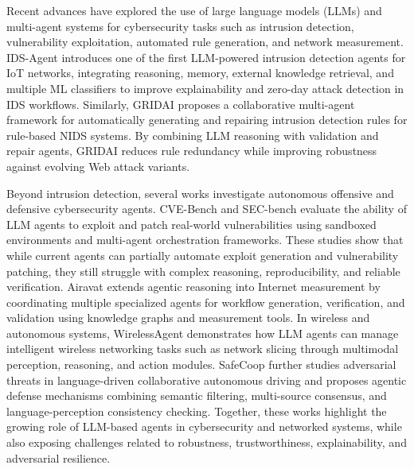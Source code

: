 \documentclass[10pt, twocolumn, letterpaper]{article}
\begin{document}
Recent advances have explored the use of large language models (LLMs) and multi-agent systems for cybersecurity tasks such as intrusion detection, vulnerability exploitation, automated rule generation, and network measurement. IDS-Agent \cite{idsagent}introduces one of the first LLM-powered intrusion detection agents for IoT networks, integrating reasoning, memory, external knowledge retrieval, and multiple ML classifiers to improve explainability and zero-day attack detection in IDS workflows. Similarly, GRIDAI \cite{gridAI} proposes a collaborative multi-agent framework for automatically generating and repairing intrusion detection rules for rule-based NIDS systems. By combining LLM reasoning with validation and repair agents, GRIDAI reduces rule redundancy while improving robustness against evolving Web attack variants.

Beyond intrusion detection, several works investigate autonomous offensive and defensive cybersecurity agents. CVE-Bench \cite{cvebench}and SEC-bench \cite{secbench} evaluate the ability of LLM agents to exploit and patch real-world vulnerabilities using sandboxed environments and multi-agent orchestration frameworks. These studies show that while current agents can partially automate exploit generation and vulnerability patching, they still struggle with complex reasoning, reproducibility, and reliable verification. Airavat \cite{airavat} extends agentic reasoning into Internet measurement by coordinating multiple specialized agents for workflow generation, verification, and validation using knowledge graphs and measurement tools. In wireless and autonomous systems, WirelessAgent \cite{wirelessagent} demonstrates how LLM agents can manage intelligent wireless networking tasks such as network slicing through multimodal perception, reasoning, and action modules. SafeCoop \cite{safecoop} further studies adversarial threats in language-driven collaborative autonomous driving and proposes agentic defense mechanisms combining semantic filtering, multi-source consensus, and language-perception consistency checking. Together, these works highlight the growing role of LLM-based agents in cybersecurity and networked systems, while also exposing challenges related to robustness, trustworthiness, explainability, and adversarial resilience.
\end{document}
